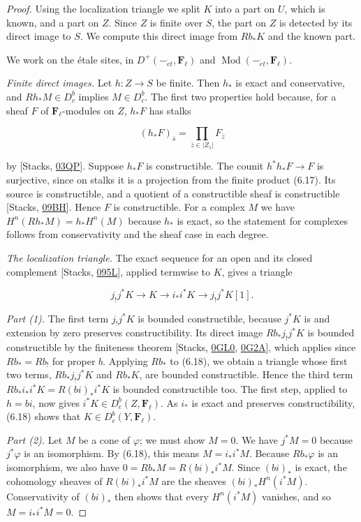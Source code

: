 \documentclass[11pt]{article}
\providecommand{\Dbc}{}\renewcommand{\Dbc}{D^b_c}
\providecommand{\Fell}{}\renewcommand{\Fell}{\mathbf F_\ell}
\begin{document}
\begin{proof}[{Proof}]\label{bp39}%
Using the localization triangle we split \(K\) into a part on \(U\), which is known, and a part on \(Z\). Since \(Z\) is finite over \(S\), the part on \(Z\) is detected by its direct image to \(S\). We compute this direct image from \(Rb_*K\) and the known part.

We work on the étale sites, in \(D^+(-_{\acute{e}t},\Fell)\) and \(\operatorname{Mod}(-_{\acute{e}t},\Fell)\).

\emph{Finite direct images.} Let \(h:Z\to S\) be finite. Then \(h_*\) is exact and conservative, and \(Rh_*M\in\Dbc\) implies \(M\in\Dbc\). The first two properties hold because, for a sheaf \(F\) of \(\Fell\)-modules on \(Z\), \(h_*F\) has stalks

\[
(h_*F)_{\bar s}
=\prod_{\bar z\in |Z_{\bar s}|}F_{\bar z}
\tag{6.17}
\]

by [Stacks, \href{https://stacks.math.columbia.edu/tag/03QP}{03QP}]. Suppose \(h_*F\) is constructible. The counit \(h^*h_*F\to F\) is surjective, since on stalks it is a projection from the finite product (6.17). Its source is constructible, and a quotient of a constructible sheaf is constructible [Stacks, \href{https://stacks.math.columbia.edu/tag/09BH}{09BH}]. Hence \(F\) is constructible. For a complex \(M\) we have \(H^n(Rh_*M)=h_*H^n(M)\) because \(h_*\) is exact, so the statement for complexes follows from conservativity and the sheaf case in each degree.

\emph{The localization triangle.} The exact sequence for an open and its closed complement [Stacks, \href{https://stacks.math.columbia.edu/tag/095L}{095L}], applied termwise to \(K\), gives a triangle

\[
j_!j^*K\longrightarrow K\longrightarrow i_*i^*K
\longrightarrow j_!j^*K[1].
\tag{6.18}
\]

\emph{Part (1).} The first term \(j_!j^*K\) is bounded constructible, because \(j^*K\) is and extension by zero preserves constructibility. Its direct image \(Rb_*j_!j^*K\) is bounded constructible by the finiteness theorem [Stacks, \href{https://stacks.math.columbia.edu/tag/0GL0}{0GL0}, \href{https://stacks.math.columbia.edu/tag/0G2A}{0G2A}], which applies since \(Rb_*=Rb_!\) for proper \(b\). Applying \(Rb_*\) to (6.18), we obtain a triangle whose first two terms, \(Rb_*j_!j^*K\) and \(Rb_*K\), are bounded constructible. Hence the third term \(Rb_*i_*i^*K=R(bi)_*i^*K\) is bounded constructible too. The first step, applied to \(h=bi\), now gives \(i^*K\in\Dbc(Z,\Fell)\). As \(i_*\) is exact and preserves constructibility, (6.18) shows that \(K\in\Dbc(Y,\Fell)\).

\emph{Part (2).} Let \(M\) be a cone of \(\varphi\); we must show \(M=0\). We have \(j^*M=0\) because \(j^*\varphi\) is an isomorphism. By (6.18), this means \(M=i_*i^*M\). Because \(Rb_*\varphi\) is an isomorphism, we also have \(0=Rb_*M=R(bi)_*i^*M\). Since \((bi)_*\) is exact, the cohomology sheaves of \(R(bi)_*i^*M\) are the sheaves \((bi)_*H^n(i^*M)\). Conservativity of \((bi)_*\) then shows that every \(H^n(i^*M)\) vanishes, and so \(M=i_*i^*M=0\).
\end{proof}
\end{document}
